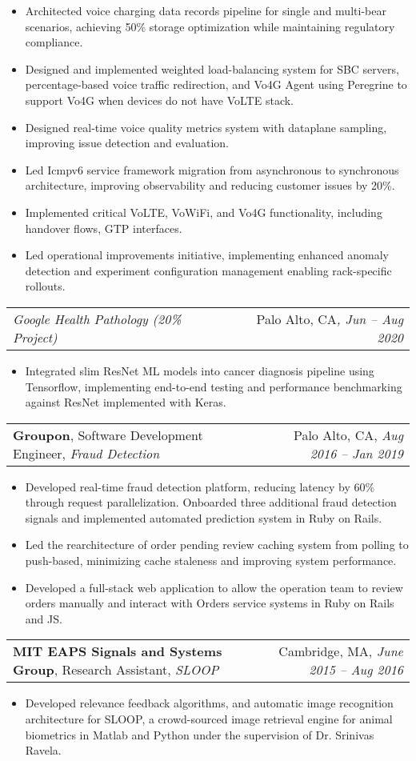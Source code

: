 \documentclass[letterpaper,11pt]{article}
\makeatletter
\newcommand{\resumeItem}[1]{
  \item\small{
    {#1 \vspace{-3pt}}
  }
}
\newcommand{\resumeSubheading}[5]{
  \vspace{-1pt}\item
    \begin{tabular*}{0.97\textwidth}[t]{l@{\extracolsep{\fill}}r}
      \textbf{#1}{\small, #2, \textit{#3}} &  {\small#4}{, \textit{\small #5}} \\
    \end{tabular*}
    \vspace{-7pt}
}
\newcommand{\resumeSubSubheadingMultiteam}[4]{
    \begin{tabular*}{0.97\textwidth}{l@{\extracolsep{\fill}}r}
      \textit{\small#1}{ \scriptsize #4} & {\small#2}\textit{\small, #3} \\
    \end{tabular*}
    \vspace{-7pt}
}
\newcommand{\resumeItemListStart}{\begin{itemize}}
\newcommand{\resumeItemListEnd}{\end{itemize}\vspace{-5pt}}
\makeatother
\begin{document}
      \resumeItemListStart
\resumeItem{Architected voice charging data records pipeline for single and multi-bear scenarios, achieving 50\% storage optimization while maintaining regulatory compliance.}
\resumeItem{Designed and implemented weighted load-balancing system for SBC servers, percentage-based voice traffic redirection, and Vo4G Agent using Peregrine to support Vo4G when devices do not have VoLTE stack.}
\resumeItem{Designed real-time voice quality metrics system with dataplane sampling, improving issue detection and evaluation.} %
\resumeItem{Led Icmpv6 service framework migration from asynchronous to synchronous architecture, improving observability and reducing customer issues by 20\%.}
\resumeItem{Implemented critical VoLTE, VoWiFi, and Vo4G functionality, including handover flows, GTP interfaces.}
\resumeItem{Led operational improvements initiative, implementing enhanced anomaly detection and experiment configuration management enabling rack-specific rollouts.}
      \resumeItemListEnd

  \resumeSubSubheadingMultiteam
   {Google Health Pathology (20\% Project)}{Palo Alto, CA}{Jun -- Aug 2020}{}
      \resumeItemListStart
\resumeItem{Integrated slim ResNet ML models into cancer diagnosis pipeline using Tensorflow, implementing end-to-end testing and performance benchmarking against ResNet implemented with Keras.}
      \resumeItemListEnd

    \resumeSubheading
      {Groupon}{Software Development Engineer}{Fraud Detection}
      {Palo Alto, CA}{Aug 2016 -- Jan 2019}
      
      \resumeItemListStart
        \resumeItem{Developed real-time fraud detection platform, reducing latency by 60\% through request parallelization. Onboarded three additional fraud detection signals and implemented automated prediction system in Ruby on Rails.}
        \resumeItem{
        Led the rearchitecture of order pending review caching system from polling to push-based, minimizing cache staleness and improving system performance.}
        \resumeItem{Developed a full-stack web application to allow the operation team to review orders manually and interact with Orders service systems in Ruby on Rails and JS.}
      \resumeItemListEnd

    \resumeSubheading
      {MIT EAPS Signals and Systems Group}{Research Assistant}{SLOOP}
      {Cambridge, MA}{June 2015 -- Aug 2016}
      \resumeItemListStart
        \resumeItem{Developed relevance feedback algorithms, and automatic image recognition architecture for SLOOP, a crowd-sourced image retrieval engine for animal biometrics in Matlab and Python under the supervision of Dr. Srinivas Ravela.}
      \resumeItemListEnd
\end{document}

